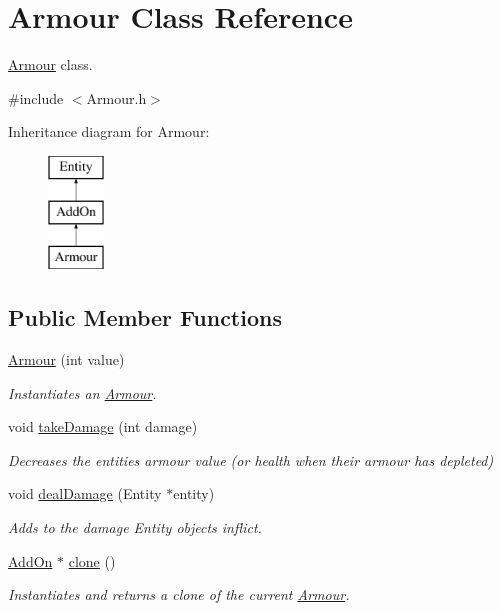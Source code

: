 \hypertarget{classArmour}{}\section{Armour Class Reference}
\label{classArmour}


\hyperlink{classArmour}{Armour} class.  




{\ttfamily \#include $<$Armour.\+h$>$}

Inheritance diagram for Armour\+:\begin{figure}[H]
\begin{center}
\leavevmode
\includegraphics[height=3.000000cm]{classArmour}
\end{center}
\end{figure}
\subsection*{Public Member Functions}
\begin{DoxyCompactItemize}
\item 
\hyperlink{classArmour_a5fe1e213870c5eab65baa54bb4a3ef02}{Armour} (int value)
\begin{DoxyCompactList}\small\item\em Instantiates an \hyperlink{classArmour}{Armour}. \end{DoxyCompactList}\item 
void \hyperlink{classArmour_a7a52bd8473173c81a4ba8a6373513581}{take\+Damage} (int damage)
\begin{DoxyCompactList}\small\item\em Decreases the entities\textquotesingle{} armour value (or health when their armour has depleted) \end{DoxyCompactList}\item 
void \hyperlink{classArmour_acce6c768aaebaa559ac063e9d67c53b5}{deal\+Damage} (Entity $\ast$entity)
\begin{DoxyCompactList}\small\item\em Adds to the damage Entity objects inflict. \end{DoxyCompactList}\item 
\hyperlink{classAddOn}{Add\+On} $\ast$ \hyperlink{classArmour_ab200b02561ecc30c20397913a2bc9511}{clone} ()
\begin{DoxyCompactList}\small\item\em Instantiates and returns a clone of the current \hyperlink{classArmour}{Armour}. \end{DoxyCompactList}\end{DoxyCompactItemize}
